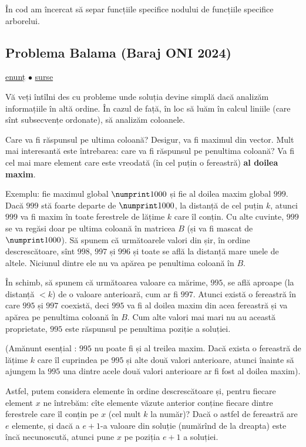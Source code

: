 \documentclass[../main.tex]{subfiles}
\begin{document}
În cod am încercat să separ funcțiile specifice nodului de funcțiile specifice arborelui.

\subsection{Problema Balama (Baraj ONI 2024)}
\label{problem:balama}

\href{https://kilonova.ro/problems/2666}{enunț}
$\bullet$
\hyperref[code:balama]{surse}

Vă veți întîlni des cu probleme unde soluția devine simplă dacă analizăm informațiile în altă ordine. În cazul de față, în loc să luăm în calcul liniile (care sînt subsecvențe ordonate), să analizăm coloanele.

Care va fi răspunsul pe ultima coloană? Desigur, va fi maximul din vector. Mult mai interesantă este întrebarea: care va fi răspunsul pe penultima coloană? Va fi cel mai mare element care este vreodată (în cel puțin o fereastră) \textbf{al doilea maxim}.

Exemplu: fie maximul global $\np{1000}$ și fie al doilea maxim global $999$. Dacă $999$ stă foarte departe de $\np{1000}$, la distanță de cel puțin $k$, atunci $999$ va fi maxim în toate ferestrele de lățime $k$ care îl conțin. Cu alte cuvinte, $999$ se va regăsi doar pe ultima coloană în matricea $B$ (și va fi mascat de $\np{1000}$). Să spunem că următoarele valori din șir, în ordine descrescătoare, sînt $998$, $997$ și $996$ și toate se află la distanță mare unele de altele. Niciunul dintre ele nu va apărea pe penultima coloană în $B$.

În schimb, să spunem că următoarea valoare ca mărime, $995$, se află aproape (la distanță $< k$) de o valoare anterioară, cum ar fi $997$. Atunci există o fereastră în care $995$ și $997$ coexistă, deci $995$ va fi al doilea maxim din acea fereastră și va apărea pe penultima coloană în $B$. Cum alte valori mai mari nu au această proprietate, $995$ este răspunsul pe penultima poziție a soluției.

(Amănunt esențial : $995$ nu poate fi și al treilea maxim. Dacă exista o fereastră de lățime $k$ care îl cuprindea pe $995$ și alte două valori anterioare, atunci înainte să ajungem la $995$ una dintre acele două valori anterioare ar fi fost al doilea maxim).

Astfel, putem considera elemente în ordine descrescătoare și, pentru fiecare element $x$ ne întrebăm: cîte elemente văzute anterior conține fiecare dintre ferestrele care îl conțin pe $x$ (cel mult $k$ la număr)? Dacă o astfel de fereastră are $e$ elemente, și dacă a $e+1$-a valoare din soluție (numărînd de la dreapta) este încă necunoscută, atunci pune $x$ pe poziția $e+1$ a soluției.
\end{document}
